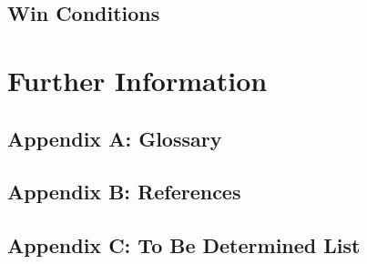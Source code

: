 \documentclass{scrreprt}
\begin{document}
\section{Win Conditions}

\chapter{Further Information}

\section{Appendix A: Glossary}

\section{Appendix B: References}

\section{Appendix C: To Be Determined List}
\end{document}
